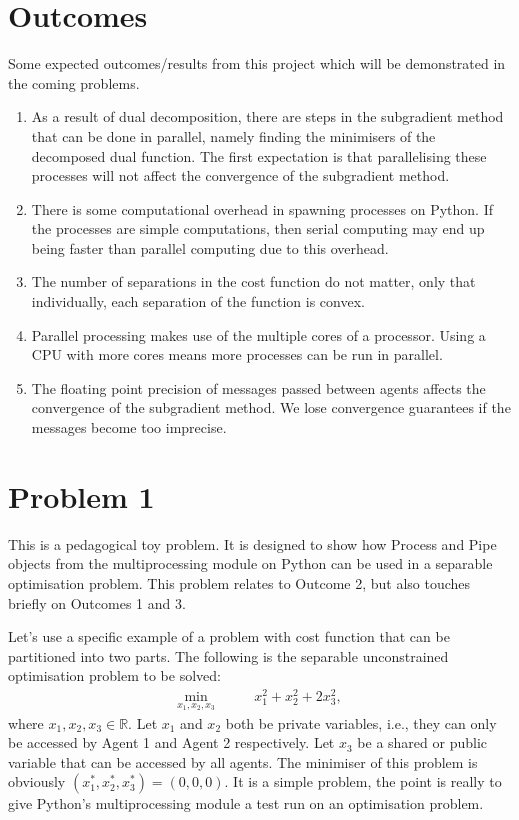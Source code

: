 \documentclass[12pt]{article}
\begin{document}
\section*{Outcomes}

Some expected outcomes/results from this project which will be demonstrated in the coming problems.

\begin{enumerate}
	\item As a result of dual decomposition, there are steps in the subgradient method that can be done in parallel, namely finding the minimisers of the decomposed dual function. The first expectation is that parallelising these processes will not affect the convergence of the subgradient method.
	\item There is some computational overhead in spawning processes on Python. If the processes are simple computations, then serial computing may end up being faster than parallel computing due to this overhead.
	\item The number of separations in the cost function do not matter, only that individually, each separation of the function is convex.
	\item Parallel processing makes use of the multiple cores of a processor. Using a CPU with more cores means more processes can be run in parallel.
	\item The floating point precision of messages passed between agents affects the convergence of the subgradient method. We lose convergence guarantees if the messages become too imprecise.
\end{enumerate}

\section*{Problem 1}

This is a pedagogical toy problem. It is designed to show how Process and Pipe objects from the multiprocessing module on Python can be used in a separable optimisation problem. This problem relates to Outcome 2, but also touches briefly on Outcomes 1 and 3.

Let's use a specific example of a problem with cost function that can be partitioned into two parts. The following is the separable unconstrained optimisation problem to be solved:
\begin{align*}
\min_{x_1,x_2,x_3}\qquad& x_1^2+x_2^2+2x_3^2,
\end{align*}
where $x_1,x_2,x_3\in\mathbb{R}$. Let $x_1$ and $x_2$ both be private variables, i.e., they can only be accessed by Agent 1 and Agent 2 respectively. Let $x_3$ be a shared or public variable that can be accessed by all agents. The minimiser of this problem is obviously $(x_1^*,x_2^*,x_3^*)=(0,0,0)$. It is a simple problem, the point is really to give Python's multiprocessing module a test run on an optimisation problem. 
\end{document}
